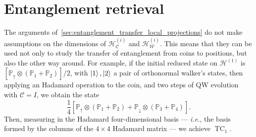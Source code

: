 \documentclass[
	aps, pra,
	superscriptaddress, twocolumn,
	floatfix,
	10pt
]{revtex4-1}
\newcommand{\on}[1]{\operatorname{#1}}
\newcommand{\PP}{\mathbb{P}}
\newcommand{\calC}{{\mathcal{C}}}
\newcommand{\calH}{{\mathcal{H}}}
\newcommand{\calW}{{\mathcal{W}}}
\newcommand{\HC}{\calH_\calC}
\newcommand{\HW}{\calH_\calW}
\begin{document}
\section{Entanglement retrieval}
\label{sec:entanglement_retrieval}

The arguments of~\cref{sec:entanglement_transfer_local_projections} do not make assumptions on the dimensions of $\HC^{(i)}$ and $\HW^{(i)}$. This means that they can be used not only to study the transfer of entanglement from coins to positions, but also the other way around.
For example, if the initial reduced state on $\calH^{(1)}$ is
    $[\PP_\uparrow\otimes (\PP_1+\PP_2)]/2$,
with $\ket1,\ket2$ a pair of orthonormal walker's states, then applying an Hadamard operation to the coin, and two steps of QW evolution with $\calC=I$, we obtain the state
\begin{equation}
    \frac14[\PP_\uparrow\otimes(\PP_1+\PP_2) + \PP_\downarrow\otimes(\PP_3+\PP_4)].
\end{equation}
Then, measuring in the Hadamard four-dimensional basis --- \textit{i.e.}, the basis formed by the columns of the $4\times4$ Hadamard matrix --- we achieve $\on{TC}_1$.

\end{document}
